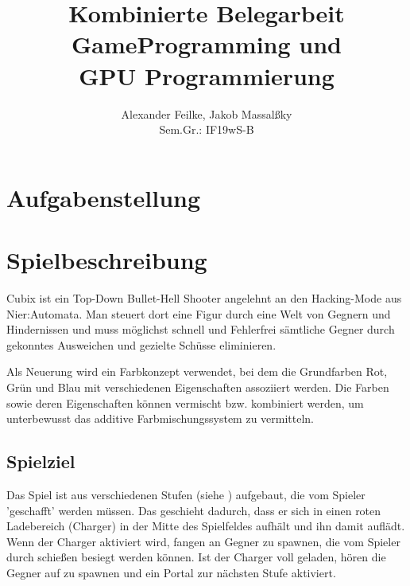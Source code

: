 \documentclass[a4paper,10pt,ngerman,fontsize=12pt]{scrreprt}
\title{Kombinierte Belegarbeit \\ GameProgramming und \\ GPU Programmierung}
\author{Alexander Feilke, Jakob Massal{\ss}ky \\ Sem.Gr.: IF19wS-B}
\begin{document}
\normalfont

\maketitle
\newpage %

\renewcommand{\contentsname}{Inhaltsverzeichnis}
\tableofcontents
\newpage


\sloppy
\flushbottom



\chapter{Aufgabenstellung}
\lipsum[3]





\chapter{Spielbeschreibung}

Cubix ist ein Top-Down Bullet-Hell Shooter angelehnt an den Hacking-Mode aus Nier:Automata\cite{qNierHM}.
Man steuert dort eine Figur durch eine Welt von Gegnern und Hindernissen und muss möglichst schnell und Fehlerfrei sämtliche Gegner durch gekonntes Ausweichen und gezielte Schüsse eliminieren.

Als Neuerung wird ein Farbkonzept verwendet, bei dem die Grundfarben Rot, Grün und Blau mit verschiedenen Eigenschaften assoziiert werden. Die Farben sowie deren Eigenschaften können vermischt bzw. kombiniert werden, um unterbewusst das additive Farbmischungssystem zu vermitteln.




\section{Spielziel}

Das Spiel ist aus verschiedenen Stufen (siehe ) aufgebaut, die vom Spieler 'geschafft' werden müssen.
Das geschieht dadurch, dass er sich in einen roten Ladebereich (Charger) in der Mitte des Spielfeldes aufhält und ihn damit auflädt.
Wenn der Charger aktiviert wird, fangen an Gegner zu spawnen, die vom Spieler durch schießen besiegt werden können.
Ist der Charger voll geladen, hören die Gegner auf zu spawnen und ein Portal zur nächsten Stufe aktiviert.
\end{document}
